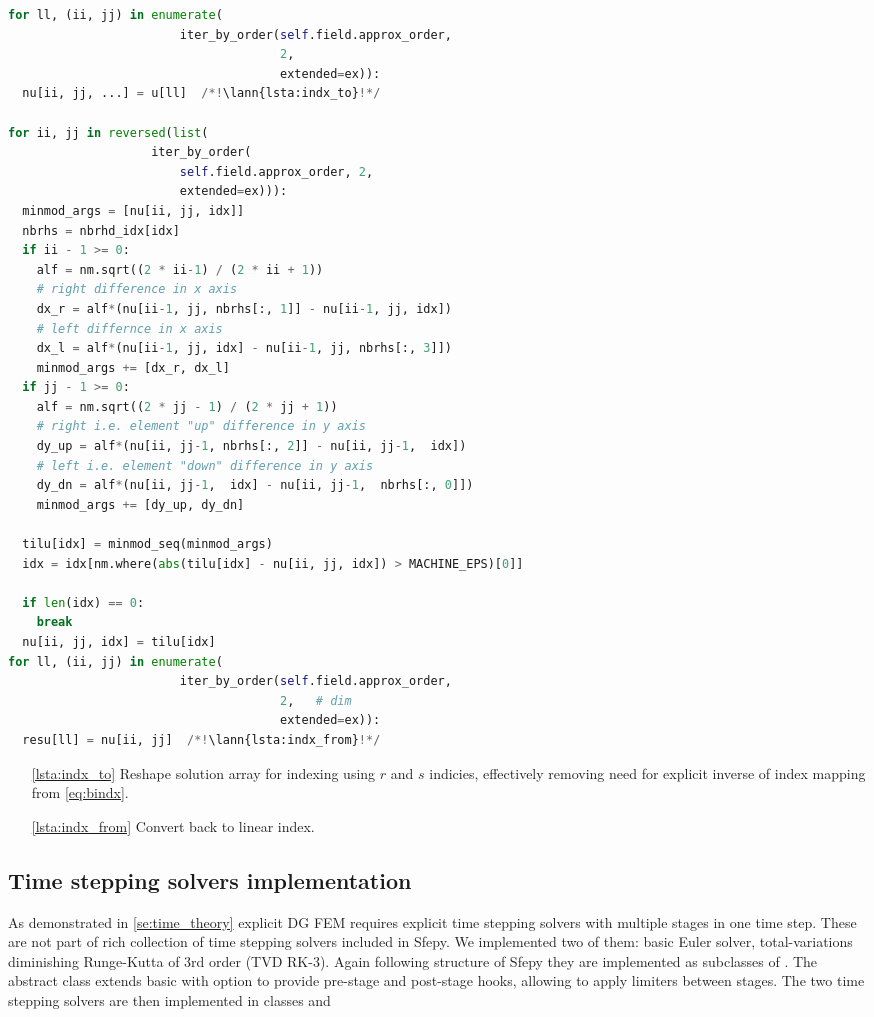 \setcounter{lstannotation}{0}
\begin{lstlisting}[language=Python, caption=Moment limiter for 
cartesian grid \label{lst:limiter_2D}]
for ll, (ii, jj) in enumerate(
						iter_by_order(self.field.approx_order, 
									  2,
									  extended=ex)):
  nu[ii, jj, ...] = u[ll]  /*!\lann{lsta:indx_to}!*/

for ii, jj in reversed(list(
					iter_by_order(
						self.field.approx_order, 2,
						extended=ex))):
  minmod_args = [nu[ii, jj, idx]]
  nbrhs = nbrhd_idx[idx]
  if ii - 1 >= 0:
  	alf = nm.sqrt((2 * ii-1) / (2 * ii + 1))
  	# right difference in x axis
  	dx_r = alf*(nu[ii-1, jj, nbrhs[:, 1]] - nu[ii-1, jj, idx])
  	# left differnce in x axis
  	dx_l = alf*(nu[ii-1, jj, idx] - nu[ii-1, jj, nbrhs[:, 3]])
  	minmod_args += [dx_r, dx_l]
  if jj - 1 >= 0:
  	alf = nm.sqrt((2 * jj - 1) / (2 * jj + 1))
  	# right i.e. element "up" difference in y axis
  	dy_up = alf*(nu[ii, jj-1, nbrhs[:, 2]] - nu[ii, jj-1,  idx])
  	# left i.e. element "down" difference in y axis
  	dy_dn = alf*(nu[ii, jj-1,  idx] - nu[ii, jj-1,  nbrhs[:, 0]])
  	minmod_args += [dy_up, dy_dn]
  	
  tilu[idx] = minmod_seq(minmod_args)
  idx = idx[nm.where(abs(tilu[idx] - nu[ii, jj, idx]) > MACHINE_EPS)[0]]
  
  if len(idx) == 0:
  	break
  nu[ii, jj, idx] = tilu[idx]
for ll, (ii, jj) in enumerate(
						iter_by_order(self.field.approx_order, 
									  2,   # dim
									  extended=ex)):
  resu[ll] = nu[ii, jj]  /*!\lann{lsta:indx_from}!*/

\end{lstlisting}
\begin{itemize}
	\item[\ref{lsta:indx_to}] Reshape solution array for indexing using $r$ and $s$ indicies, effectively removing need for explicit inverse of index mapping from \eqref{eq:bindx}.
	
	\item [\ref{lsta:indx_from}] Convert back to linear index.
\end{itemize}


\subsection{Time stepping solvers implementation}
As demonstrated in \ref{se:time_theory} explicit DG FEM requires explicit time 
stepping solvers with multiple stages in one time step. These are not part of 
rich collection of time stepping solvers included in Sfepy. We implemented 
two of them: basic Euler solver, total-variations diminishing Runge-Kutta 
of 3rd order (TVD RK-3). 
Again following 
structure of Sfepy they are implemented as subclasses of 
. The abstract class  
extends basic  with option to provide pre-stage and 
post-stage hooks, allowing to apply limiters between stages. The two time stepping 
solvers are then implemented in classes  and 

